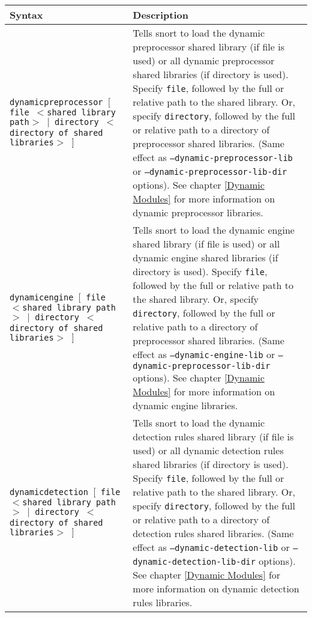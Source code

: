 \documentclass[english]{report}
\begin{document}
\begin{longtable}{| p{2in} | p{4in} |}
\hline
{\bf Syntax} & {\bf Description}\\
\hline

\hline
\texttt{dynamicpreprocessor $[$ file $<$shared library path$>$ $|$ directory
$<$directory of shared libraries$>$ $]$} &

Tells snort to load the dynamic preprocessor shared library (if file is used)
or all dynamic preprocessor shared libraries (if directory is used).  Specify
\texttt{file}, followed by the full or relative path to the shared library.  Or,
specify \texttt{directory}, followed by the full or relative path to a directory of
preprocessor shared libraries.  (Same effect as
\texttt{--dynamic-preprocessor-lib} or \texttt{--dynamic-preprocessor-lib-dir}
options).  See chapter \ref{Dynamic Modules} for more information on dynamic
preprocessor libraries.\\

\hline
\texttt{dynamicengine $[$ file $<$shared library path$>$ $|$ directory
$<$directory of shared libraries$>$ $]$} &

Tells snort to load the dynamic engine shared library (if file is used) or all
dynamic engine shared libraries (if directory is used).  Specify \texttt{file},
followed by the full or relative path to the shared library.  Or, specify
\texttt{directory}, followed by the full or relative path to a directory of
preprocessor shared libraries.  (Same effect as \texttt{--dynamic-engine-lib}
or \texttt{--dynamic-preprocessor-lib-dir} options).  See chapter \ref{Dynamic
Modules} for more information on dynamic engine libraries.\\

\hline
\texttt{dynamicdetection $[$ file $<$shared library path$>$ $|$ directory
$<$directory of shared libraries$>$ $]$} &

Tells snort to load the dynamic detection rules shared library (if file is
used) or all dynamic detection rules shared libraries (if directory is used).
Specify \texttt{file}, followed by the full or relative path to the shared library.
Or, specify \texttt{directory}, followed by the full or relative path to a directory
of detection rules shared libraries.  (Same effect as
\texttt{--dynamic-detection-lib} or \texttt{--dynamic-detection-lib-dir}
options).  See chapter \ref{Dynamic Modules} for more information on dynamic
detection rules libraries.\\

\hline
\end{longtable}
\end{document}
